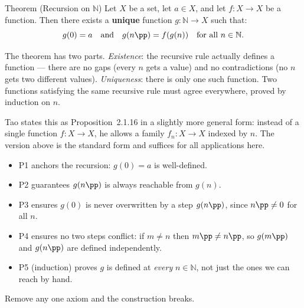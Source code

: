 
\begin{propositionbox}{Theorem (Recursion on $\mathbb{N}$)}
Let $X$ be a set, let $a \in X$, and let $f : X \to X$ be a function.
Then there exists a \textbf{unique} function $g : \mathbb{N} \to X$ such that:
\[
g(0) = a
\quad \text{and} \quad
g(n\pp) = f(g(n)) \quad \text{for all } n \in \mathbb{N}.
\]
\end{propositionbox}

\begin{remark}
The theorem has two parts.
\emph{Existence}: the recursive rule actually defines a function ---
there are no gaps (every $n$ gets a value) and no contradictions
(no $n$ gets two different values).
\emph{Uniqueness}: there is only one such function. Two functions
satisfying the same recursive rule must agree everywhere, proved
by induction on $n$.
\end{remark}

\begin{remark}
Tao states this as Proposition~2.1.16 in a slightly more general
form: instead of a single function $f : X \to X$, he allows a
family $f_n : X \to X$ indexed by $n$. The version above is the
standard form and suffices for all applications here.
\end{remark}

\begin{remark}
\begin{itemize}
  \item P1 anchors the recursion: $g(0) = a$ is well-defined.
  \item P2 guarantees $g(n\pp)$ is always reachable from $g(n)$.
  \item P3 ensures $g(0)$ is never overwritten by a step $g(n\pp)$,
    since $n\pp \neq 0$ for all $n$.
  \item P4 ensures no two steps conflict: if $m \neq n$ then
    $m\pp \neq n\pp$, so $g(m\pp)$ and $g(n\pp)$ are defined
    independently.
  \item P5 (induction) proves $g$ is defined at \emph{every}
    $n \in \mathbb{N}$, not just the ones we can reach by hand.
\end{itemize}
Remove any one axiom and the construction breaks.
\end{remark}

